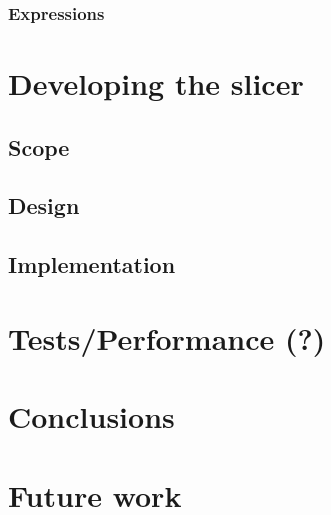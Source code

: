 \documentclass[a4paper]{article}
\begin{document}
\subsubsection{Expressions}

\section{Developing the slicer}

\subsection{Scope}

\subsection{Design}

\subsection{Implementation}

\section{Tests/Performance (?)}

\section{Conclusions}

\section{Future work}

\newpage


\end{document}
